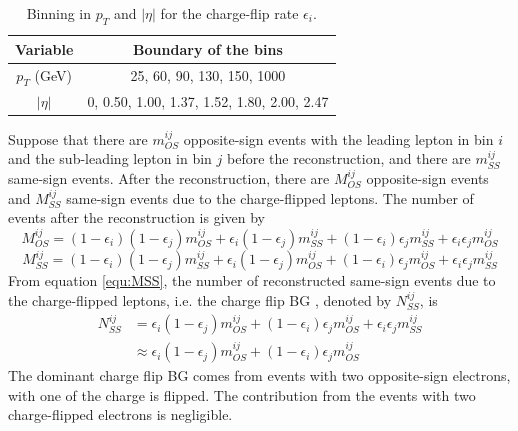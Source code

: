 \begin{table}[htbp]
\centering
\begin{tabular}{|c|c|}
\hline
Variable & Boundary of the bins \\
\hline
$p_T$ (GeV) &  25, 60, 90, 130, 150, 1000 \\
\hline
$|\eta|$ & 0, 0.50, 1.00, 1.37, 1.52, 1.80, 2.00, 2.47 \\
\hline
\end{tabular}
\caption{Binning in $p_T$ and $|\eta|$ for the charge-flip rate $\epsilon_i$.}
\label{tab:binning_charge_flip}
\end{table}

Suppose that there are $m^{ij}_{OS}$ opposite-sign events with the leading lepton in bin $i$ and the sub-leading lepton in bin $j$ before the reconstruction, and there are $m^{ij}_{SS}$ same-sign events.
After the reconstruction, there are $M^{ij}_{OS}$ opposite-sign events and $M^{ij}_{SS}$ same-sign events due to the charge-flipped leptons.
The number of events after the reconstruction is given by
\begin{equation}
M^{ij}_{OS} = (1-\epsilon_i) (1-\epsilon_j) m^{ij}_{OS} + \epsilon_i (1-\epsilon_j) m^{ij}_{SS} + (1-\epsilon_i) \epsilon_j m^{ij}_{SS} + \epsilon_i \epsilon_j m^{ij}_{OS}
\end{equation}
\begin{equation}
M^{ij}_{SS} = (1-\epsilon_i) (1-\epsilon_j) m^{ij}_{SS} + \epsilon_i (1-\epsilon_j) m^{ij}_{OS} + (1-\epsilon_i) \epsilon_j m^{ij}_{OS} + \epsilon_i \epsilon_j m^{ij}_{SS}
\label{equ:MSS}
\end{equation}
From equation \ref{equ:MSS}, the number of reconstructed same-sign events due to the charge-flipped leptons, i.e. the charge flip BG , denoted by $N^{ij}_{SS}$, is
\begin{align}
N^{ij}_{SS}
&= \epsilon_i (1-\epsilon_j) m^{ij}_{OS} + (1-\epsilon_i) \epsilon_j m^{ij}_{OS} + \epsilon_i \epsilon_j m^{ij}_{SS} \\
&\approx \epsilon_i (1-\epsilon_j) m^{ij}_{OS} + (1-\epsilon_i) \epsilon_j m^{ij}_{OS}
\label{equ:NSS}
\end{align}
The dominant charge flip BG comes from events with two opposite-sign electrons, with one of the charge is flipped.
The contribution from the events with two charge-flipped electrons is negligible.

